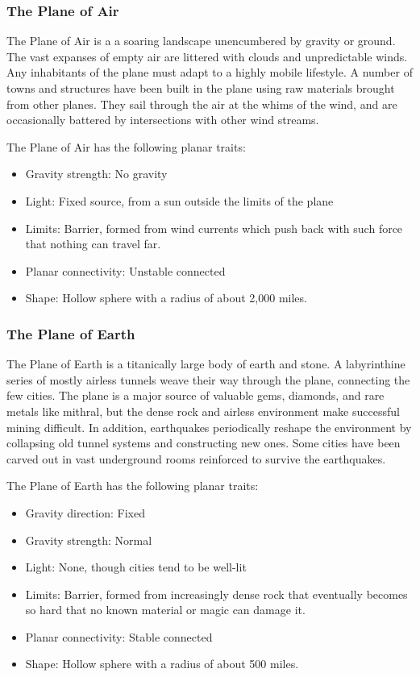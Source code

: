     \subsubsection{The Plane of Air}
      The Plane of Air is a a soaring landscape unencumbered by gravity or ground.
      The vast expanses of empty air are littered with clouds and unpredictable winds.
      Any inhabitants of the plane must adapt to a highly mobile lifestyle.
      A number of towns and structures have been built in the plane using raw materials brought from other planes.
      They sail through the air at the whims of the wind, and are occasionally battered by intersections with other wind streams.

      The Plane of Air has the following planar traits:
      \begin{itemize}
        \item Gravity strength: No gravity
        \item Light: Fixed source, from a sun outside the limits of the plane
        \item Limits: Barrier, formed from wind currents which push back with such force that nothing can travel far.
        \item Planar connectivity: Unstable connected
        \item Shape: Hollow sphere with a radius of about 2,000 miles.
      \end{itemize}

    \subsubsection{The Plane of Earth}
      The Plane of Earth is a titanically large body of earth and stone.
      A labyrinthine series of mostly airless tunnels weave their way through the plane, connecting the few cities.
      The plane is a major source of valuable gems, diamonds, and rare metals like mithral, but the dense rock and airless environment make successful mining difficult.
      In addition, earthquakes periodically reshape the environment by collapsing old tunnel systems and constructing new ones.
      Some cities have been carved out in vast underground rooms reinforced to survive the earthquakes.

      The Plane of Earth has the following planar traits:
      \begin{itemize}
        \item Gravity direction: Fixed
        \item Gravity strength: Normal
        \item Light: None, though cities tend to be well-lit
        \item Limits: Barrier, formed from increasingly dense rock that eventually becomes so hard that no known material or magic can damage it.
        \item Planar connectivity: Stable connected
        \item Shape: Hollow sphere with a radius of about 500 miles.
      \end{itemize}

